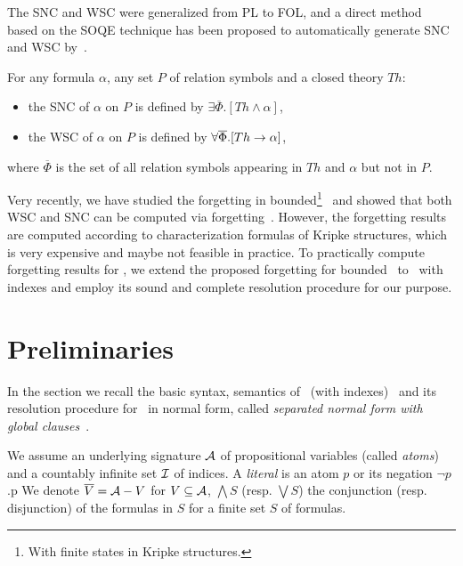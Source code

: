 \documentclass[twoside,11pt]{article}
\begin{document}
The SNC and WSC were generalized from PL to FOL, and a direct method based
on the SOQE technique has been proposed to automatically generate SNC and WSC by~.
\begin{theorem}
	For any formula $\alpha$, any set $P$ of relation symbols and a closed theory $Th$:
	\begin{itemize}
		\item the SNC of $\alpha$ on $P$ is defined by $\exists\overline{\Phi}.[Th \wedge \alpha]$,
		\item the WSC of $\alpha$ on $P$ is defined by $\forall\overline{\Phi}.[Th \rightarrow \alpha]$,
	\end{itemize}
	where $\overline{\Phi}$ is the set of all relation symbols appearing in $Th$ and $\alpha$ but not in $P$.
\end{theorem}


Very recently, we have studied the forgetting in bounded\footnote{With finite states in Kripke structures.} \CTL\ and showed that both WSC and SNC can be computed
via forgetting~\cite{renyansfirstpaper}. However, the forgetting results are computed according to characterization formulas of Kripke structures, which is very expensive and maybe not feasible in practice.
To practically compute forgetting results for \CTL, we extend the proposed forgetting for bounded \CTL\ to
\CTL\ with indexes and employ its sound and complete resolution procedure for our purpose.

\section{Preliminaries}
\label{preliminaries}

In the section we recall the basic syntax, semantics of \CTL\ (with indexes)~\cite{DBLP:journals/toplas/ClarkeES86,emerson1990temporal,Baier:PMC:2008} and its resolution procedure for \CTL\ in normal form, called {\em separated normal form with global clauses}~\cite{zhang2014resolution}.

We assume an underlying signature ${\cal A}$ of propositional variables (called {\em atoms}) and a countably infinite set ${\cal I}$ of indices.
A {\em literal} is an atom $p$ or its negation $\neg p$.p
We denote $\overline V={\cal A} - V$ for $V\subseteq \cal A$, $\bigwedge S$ (resp. $\bigvee S$) the conjunction (resp. disjunction)
of the formulas in $S$ for a finite set $S$ of formulas.
\end{document}
